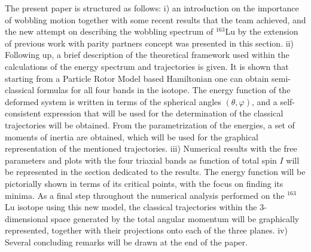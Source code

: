 The present paper is structured as follows: i) an introduction on the importance of wobbling motion together with some recent results that the team achieved, and the new attempt on describing the wobbling spectrum of $^{163}$Lu by the extension of previous work with parity partners concept was presented in this section. ii) Following up, a brief description of the theoretical framework used within the calculations of the energy spectrum and trajectories is given. It is shown that starting from a Particle Rotor Model based Hamiltonian one can obtain semi-classical formulas for all four bands in the isotope. The energy function of the deformed system is written in terms of the spherical angles $(\theta,\varphi)$, and a self-consistent expression that will be used for the determination of the classical trajectories will be obtained. From the parametrization of the energies, a set of moments of inertia are obtained, which will be used for the graphical representation of the mentioned trajectories. iii) Numerical results with the free parameters and plots with the four triaxial bands as function of total spin $I$ will be represented in the section dedicated to the results. The energy function will be pictorially shown in terms of its critical points, with the focus on finding its minima. As a final step throughout the numerical analysis performed on the $^{163}$Lu isotope using this new model, the classical trajectories within the 3-dimensional space generated by the total angular momentum will be graphically represented, together with their projections onto each of the three planes. iv) Several concluding remarks will be drawn at the end of the paper.
